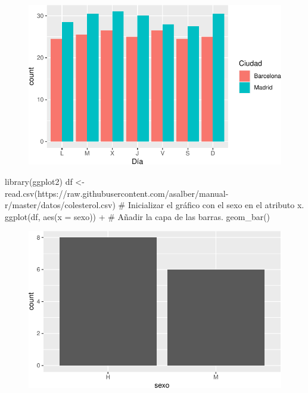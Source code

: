 \documentclass[
  a4paper,
]{scrreport}
\newenvironment{Shaded}{\begin{snugshade}}{\end{snugshade}}
\newcommand{\AttributeTok}[1]{\textcolor[rgb]{0.40,0.45,0.13}{#1}}
\newcommand{\CommentTok}[1]{\textcolor[rgb]{0.37,0.37,0.37}{#1}}
\newcommand{\FunctionTok}[1]{\textcolor[rgb]{0.28,0.35,0.67}{#1}}
\newcommand{\NormalTok}[1]{\textcolor[rgb]{0.00,0.23,0.31}{#1}}
\newcommand{\OtherTok}[1]{\textcolor[rgb]{0.00,0.23,0.31}{#1}}
\newcommand{\SpecialCharTok}[1]{\textcolor[rgb]{0.37,0.37,0.37}{#1}}
\newcommand{\StringTok}[1]{\textcolor[rgb]{0.13,0.47,0.30}{#1}}
\theoremstyle{definition}
\theoremstyle{definition}
\theoremstyle{remark}
\begin{document}
\begin{figure}[H]

{\centering \includegraphics{07-graficos_files/figure-pdf/unnamed-chunk-12-1.pdf}

}

\end{figure}

\begin{Shaded}
\begin{Highlighting}[]
\FunctionTok{library}\NormalTok{(ggplot2)}
\NormalTok{df }\OtherTok{\textless{}{-}} \FunctionTok{read.csv}\NormalTok{(}\StringTok{\textquotesingle{}https://raw.githubusercontent.com/asalber/manual{-}r/master/datos/colesterol.csv\textquotesingle{}}\NormalTok{)}
\CommentTok{\# Inicializar el gráfico con el sexo en el atributo x.}
\FunctionTok{ggplot}\NormalTok{(df, }\FunctionTok{aes}\NormalTok{(}\AttributeTok{x =}\NormalTok{ sexo)) }\SpecialCharTok{+}
\CommentTok{\# Añadir la capa de las barras.}
    \FunctionTok{geom\_bar}\NormalTok{()}
\end{Highlighting}
\end{Shaded}

\begin{figure}[H]

{\centering \includegraphics{07-graficos_files/figure-pdf/unnamed-chunk-13-1.pdf}

}

\end{figure}
\end{document}

